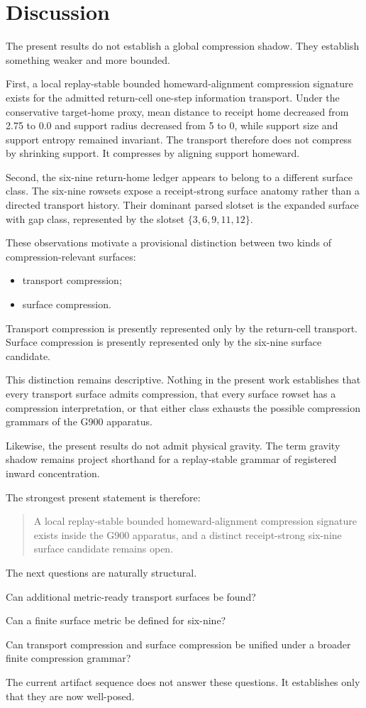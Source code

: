 \section{Discussion}

The present results do not establish a global compression shadow. They
establish something weaker and more bounded.

First, a local replay-stable bounded homeward-alignment compression signature
exists for the admitted return-cell one-step information transport. Under the
conservative target-home proxy, mean distance to receipt home decreased from
2.75 to 0.0 and support radius decreased from 5 to 0, while support size and
support entropy remained invariant. The transport therefore does not compress
by shrinking support. It compresses by aligning support homeward.

Second, the six-nine return-home ledger appears to belong to a different
surface class. The six-nine rowsets expose a receipt-strong surface anatomy
rather than a directed transport history. Their dominant parsed slotset is the
expanded surface with gap class, represented by the slotset
$\{3,6,9,11,12\}$.

These observations motivate a provisional distinction between two kinds of
compression-relevant surfaces:

\begin{itemize}
  \item transport compression;
  \item surface compression.
\end{itemize}

Transport compression is presently represented only by the return-cell
transport. Surface compression is presently represented only by the six-nine
surface candidate.

This distinction remains descriptive. Nothing in the present work establishes
that every transport surface admits compression, that every surface rowset has
a compression interpretation, or that either class exhausts the possible
compression grammars of the G900 apparatus.

Likewise, the present results do not admit physical gravity. The term gravity
shadow remains project shorthand for a replay-stable grammar of registered
inward concentration.

The strongest present statement is therefore:

\begin{quote}
A local replay-stable bounded homeward-alignment compression signature exists
inside the G900 apparatus, and a distinct receipt-strong six-nine surface
candidate remains open.
\end{quote}

The next questions are naturally structural.

Can additional metric-ready transport surfaces be found?

Can a finite surface metric be defined for six-nine?

Can transport compression and surface compression be unified under a broader
finite compression grammar?

The current artifact sequence does not answer these questions. It establishes
only that they are now well-posed.
